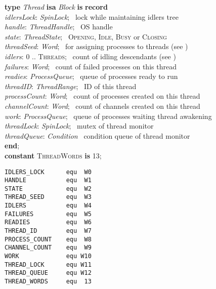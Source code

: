 \begin{tabbing}
\indents
\vb\>\textbf{type} \emph{Thread} \textbf{isa} \emph{Block} \textbf{is} \textbf{record}\\
\vb\>\>\emph{idlersLock}: \emph{SpinLock};
   \>\>\>\>\>\>\>\> \rmk\ lock while maintaining idlers tree\\
\vb\>\>\emph{handle}: \emph{ThreadHandle};
   \>\>\>\>\>\>\>\> \rmk\ OS handle\\
\vb\>\>\emph{state}: \emph{ThreadState};
   \>\>\>\>\>\>\>\> \rmk\ \textsc{Opening}, \textsc{Idle}, \textsc{Busy} or \textsc{Closing}\\
\vb\>\>\emph{threadSeed}: \emph{Word};
   \>\>\>\>\>\>\>\> \rmk\ for assigning processes to threads (see )\\
\vb\>\>\emph{idlers}: 0 .. \textsc{Threads};
   \>\>\>\>\>\>\>\> \rmk\ count of idling descendants (see )\\
\vb\>\>\emph{failures}: \emph{Word};
   \>\>\>\>\>\>\>\> \rmk\ count of failed processes on this thread\\
\vb\>\>\emph{readies}: \emph{ProcessQueue};
   \>\>\>\>\>\>\>\> \rmk\ queue of processes ready to run\\
\vb\>\>\emph{threadID}: \emph{ThreadRange};
   \>\>\>\>\>\>\>\> \rmk\ ID of this thread\\
\vb\>\>\emph{processCount}: \emph{Word};
   \>\>\>\>\>\>\>\> \rmk\ count of processes created on this thread\\
\vb\>\>\emph{channelCount}: \emph{Word};
   \>\>\>\>\>\>\>\> \rmk\ count of channels created on this thread\\
\vb\>\>\emph{work}: \emph{ProcessQueue};
   \>\>\>\>\>\>\>\> \rmk\ queue of processes waiting thread awakening\\
\vb\>\>\emph{threadLock}: \emph{SpinLock};
   \>\>\>\>\>\>\>\> \rmk\ mutex of thread monitor\\
\vb\>\>\emph{threadQueue}: \emph{Condition}
   \>\>\>\>\>\>\>\> \rmk\ condition queue of thread monitor\\
\vb\>\textbf{end};\\
\vb\>\textbf{constant} \textsc{ThreadWords} \textbf{is} 13;
\end{tabbing}

{\small
\begin{verbatim}
IDLERS_LOCK      equ  W0
HANDLE           equ  W1
STATE            equ  W2
THREAD_SEED      equ  W3
IDLERS           equ  W4
FAILURES         equ  W5
READIES          equ  W6
THREAD_ID        equ  W7
PROCESS_COUNT    equ  W8
CHANNEL_COUNT    equ  W9
WORK             equ W10
THREAD_LOCK      equ W11
THREAD_QUEUE     equ W12
THREAD_WORDS     equ  13
\end{verbatim}}


